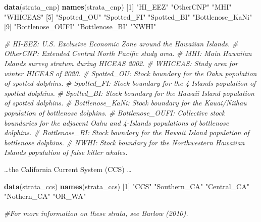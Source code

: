 \documentclass[
]{book}
\newenvironment{Shaded}{\begin{snugshade}}{\end{snugshade}}
\newcommand{\CommentTok}[1]{\textcolor[rgb]{0.56,0.35,0.01}{\textit{#1}}}
\newcommand{\DecValTok}[1]{\textcolor[rgb]{0.00,0.00,0.81}{#1}}
\newcommand{\FunctionTok}[1]{\textcolor[rgb]{0.13,0.29,0.53}{\textbf{#1}}}
\newcommand{\NormalTok}[1]{#1}
\newcommand{\StringTok}[1]{\textcolor[rgb]{0.31,0.60,0.02}{#1}}
\begin{document}
\begin{Shaded}
\begin{Highlighting}[]
\FunctionTok{data}\NormalTok{(strata\_cnp) }
\FunctionTok{names}\NormalTok{(strata\_cnp)}
\NormalTok{ [}\DecValTok{1}\NormalTok{] }\StringTok{"HI\_EEZ"}          \StringTok{"OtherCNP"}        \StringTok{"MHI"}             \StringTok{"WHICEAS"}        
\NormalTok{ [}\DecValTok{5}\NormalTok{] }\StringTok{"Spotted\_OU"}      \StringTok{"Spotted\_FI"}      \StringTok{"Spotted\_BI"}      \StringTok{"Bottlenose\_KaNi"}
\NormalTok{ [}\DecValTok{9}\NormalTok{] }\StringTok{"Bottlenose\_OUFI"} \StringTok{"Bottlenose\_BI"}   \StringTok{"NWHI"}           

\CommentTok{\# HI{-}EEZ: U.S. Exclusive Economic Zone around the Hawaiian Islands.}
\CommentTok{\# OtherCNP: Extended Central North Pacific study area.}
\CommentTok{\# MHI: Main Hawaiian Islands survey stratum during HICEAS 2002.}
\CommentTok{\# WHICEAS: Study area for winter HICEAS of 2020.}
\CommentTok{\# Spotted\_OU: Stock boundary for the Oahu population of spotted dolphins.}
\CommentTok{\# Spotted\_FI: Stock boundary for the 4{-}Islands population of spotted dolphins.}
\CommentTok{\# Spotted\_BI: Stock boundary for the Hawaii Island population of spotted dolphins.}
\CommentTok{\# Bottlenose\_KaNi: Stock boundary for the Kauai/Niihau population of bottlenose dolphins.}
\CommentTok{\# Bottlenose\_OUFI: Collective stock boundaries for the adjacent Oahu and 4{-}Islands populations of bottlenose dolphins.}
\CommentTok{\# Bottlenose\_BI: Stock boundary for the Hawaii Island population of bottlenose dolphins.}
\CommentTok{\# NWHI: Stock boundary for the Northwestern Hawaiian Islands population of false killer whales. }
\end{Highlighting}
\end{Shaded}

\ldots the California Current System (CCS) \ldots{}

\begin{Shaded}
\begin{Highlighting}[]
\FunctionTok{data}\NormalTok{(strata\_ccs) }
\FunctionTok{names}\NormalTok{(strata\_ccs)}
\NormalTok{[}\DecValTok{1}\NormalTok{] }\StringTok{"CCS"}         \StringTok{"Southern\_CA"} \StringTok{"Central\_CA"}  \StringTok{"Nothern\_CA"}  \StringTok{"OR\_WA"}      

\CommentTok{\#For more information on these strata, see Barlow (2010).}
\end{Highlighting}
\end{Shaded}
\end{document}
